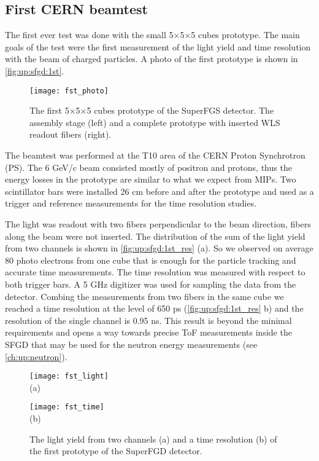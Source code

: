 \documentclass[main.tex]{subfiles}
\begin{document}
\subsection{First CERN beamtest}
\label{sec:up:sfgd:beam1}
The first ever test was done with the small 5$\times$5$\times$5 cubes prototype. The main goals of the test were the first measurement of the light yield and time resolution with the beam of charged particles. A photo of the first prototype is shown in \autoref{fig:up:sfgd:1st}.

\begin{figure}[!ht]
	\centering
	\texttt{[image: fst\_photo]}
	\caption{The first 5$\times$5$\times$5 cubes prototype of the SuperFGS detector. The assembly stage (left) and a complete prototype with inserted WLS readout fibers (right).}
	\label{fig:up:sfgd:1st}
\end{figure}

The beamtest was performed at the T10 area of the CERN Proton Synchrotron (PS). The 6 GeV/c beam consisted mostly of positron and protons, thus the energy losses in the prototype are similar to what we expect from MIPs. Two scintillator bars were installed 26 cm before and after the prototype and used as a trigger and reference measurements for the time resolution studies.

The light was readout with two fibers perpendicular to the beam direction, fibers along the beam were not inserted. The distribution of the sum of the light yield from two channels is shown in \autoref{fig:up:sfgd:1st_res} (a). So we observed on average 80 photo electrons from one cube that is enough for the particle tracking and accurate time measurements. The time resolution was measured with respect to both trigger bars. A 5 GHz digitizer was used for sampling the data from the detector. Combing the measurements from two fibers in the same cube we reached a time resolution at the level of 650 ps (\autoref{fig:up:sfgd:1st_res} b) and the resolution of the single channel is 0.95 ns. This result is beyond the minimal requirements and opens a way towards precise ToF measurements inside the SFGD that may be used for the neutron energy measurements (see \autoref{ch:up:neutron}).

\begin{figure}[!ht]
	\centering
	\begin{minipage}{0.49\linewidth}
		\centering
		\texttt{[image: fst\_light]} \\ (a)
	\end{minipage}
	\begin{minipage}{0.49\linewidth}
		\centering
		\texttt{[image: fst\_time]} \\ (b)
	\end{minipage}
	\caption{The light yield from two channels (a) and a time resolution (b) of the first prototype of the SuperFGD detector.}
	\label{fig:up:sfgd:1st_res}
\end{figure}
\end{document}
